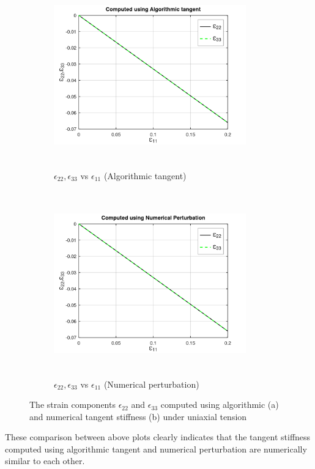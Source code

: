 \documentclass[12pt,a4paper,twoside,openright]{report}
\begin{document}
\begin{figure}[htbp!]
     \begin{subfigure}{0.4\textwidth}
         \includegraphics[width=8.3cm,height=8cm,keepaspectratio]{22.e11vse22e33_ATS.png}
         \caption{$\epsilon_{22}, \epsilon_{33}$ vs $\epsilon_{11}$ (Algorithmic tangent)}
         \label{fig:Algorithmic tangent}
     \end{subfigure}  
     \hspace{1.8cm}
     \begin{subfigure}{0.4\textwidth}
         \includegraphics[width=8.3cm,height=8cm,keepaspectratio]{22.e11vse22e33_NT.png}
         \caption{$\epsilon_{22}, \epsilon_{33}$ vs $\epsilon_{11}$ (Numerical perturbation)}
         \label{fig:Numerical perturbation}
     \end{subfigure}
        \caption{The strain components $\epsilon_{22}$ and $\epsilon_{33}$ computed using algorithmic (a) and numerical tangent stiffness (b) under uniaxial tension}
        \label{fig: Algorithmic and numerical tangent stiffness under uniaxial tension}     
\end{figure}
\FloatBarrier
These comparison between above plots clearly indicates that the tangent stiffness computed using algorithmic tangent and numerical perturbation are numerically similar to each other.
\end{document}
